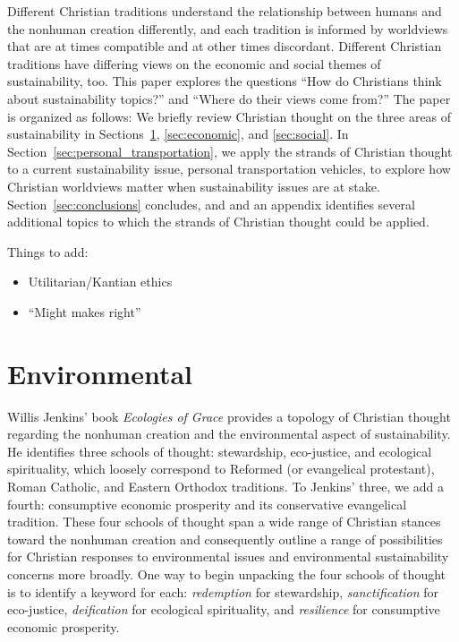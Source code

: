 \documentclass[12pt]{article}
\begin{document}
Different Christian traditions understand the relationship 
between humans and the nonhuman creation differently, and
each tradition is informed by worldviews 
that are at times compatible and at other times discordant. 
Different Christian traditions have differing views 
on the economic and social themes of sustainability, too.
This paper explores the questions 
``How do Christians think about sustainability topics?'' 
and 
``Where do their views come from?'' 
The paper is organized as follows:
We briefly review Christian thought on the three areas of sustainability
in Sections~\ref{sec:environmental}, \ref{sec:economic}, and \ref{sec:social}.
In Section~\ref{sec:personal_transportation}, 
we apply the strands of Christian thought
to a current sustainability issue,
personal transportation vehicles,
to explore how Christian worldviews matter 
when sustainability issues are at stake.
Section~\ref{sec:conclusions} concludes, and
and an appendix identifies several additional topics to which 
the strands of Christian thought could be applied.

Things to add:

\begin{itemize}

  \item Utilitarian/Kantian ethics

  \item ``Might makes right''

\end{itemize}


\section{Environmental}
\label{sec:environmental}

Willis Jenkins' book \emph{Ecologies of Grace} \autocite{Jenkins:2008}
provides a topology of Christian thought regarding the 
nonhuman creation and the
environmental aspect of sustainability.
He identifies three schools of thought:
stewardship, 
eco-justice, and 
ecological spirituality,
which loosely correspond to 
Reformed (or evangelical protestant), 
Roman Catholic, and 
Eastern Orthodox 
traditions.
To Jenkins' three, we add a fourth:
consumptive economic prosperity and
its conservative evangelical tradition. 
These four schools of thought 
span a wide range of Christian stances toward the nonhuman creation
and 
consequently outline a range of possibilities 
for Christian responses to environmental issues
and environmental sustainability concerns more broadly.
One way to begin unpacking the four schools of thought 
is to identify a keyword for each:
\emph{redemption} for stewardship, 
\emph{sanctification} for eco-justice,
\emph{deification} for ecological spirituality, and
\emph{resilience} for consumptive economic prosperity.
\end{document}
